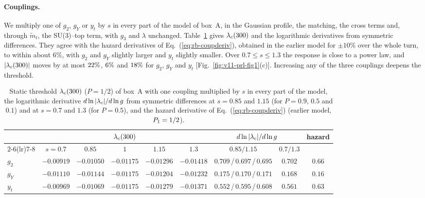 \paragraph{Couplings.}
We multiply one of $g_2$, $g_Y$ or $y_t$ by $s$ in every part of the model of box~A, in the Gaussian profile, the matching, the cross terms and, through $\tilde m_t$, the SU(3)--top term, with $g_3$ and $\lambda$ unchanged.
Table~\ref{tab:v11-coup} gives $\lambda_c(300)$ and the logarithmic derivatives from symmetric differences.
They agree with the hazard derivatives of Eq.~(\ref{eq:rb-coupderiv}), obtained in the earlier model for $\pm10\%$ over the whole turn, to within about $6\%$, with $g_2$ and $g_Y$ slightly larger and $y_t$ slightly smaller. %
Over $0.7\le s\le1.3$ the response is close to a power law, and $|\lambda_c(300)|$ moves by at most $22\%$, $6\%$ and $18\%$ for $g_2$, $g_Y$ and $y_t$ [Fig.~\ref{fig:v11-prl-fig1}(c)]. %
Increasing any of the three couplings deepens the threshold.

\begin{table}[t]
\centering
\caption{Static threshold $\lambda_c(300)$ ($P=1/2$) of box~A with one coupling multiplied by $s$ in every part of the model, the logarithmic derivative $d\ln|\lambda_c|/d\ln g$ from symmetric differences at $s=0.85$ and $1.15$ (for $P=0.9$, $0.5$ and $0.1$) and at $s=0.7$ and $1.3$ (for $P=0.5$), and the hazard derivative of Eq.~(\ref{eq:rb-coupderiv}) (earlier model, $P_1=1/2$).} %
\label{tab:v11-coup}
\small
\setlength{\tabcolsep}{4pt}
\begin{tabular}{lcccccccc}
\toprule
 & \multicolumn{5}{c}{$\lambda_c(300)$} & \multicolumn{2}{c}{$d\ln|\lambda_c|/d\ln g$} & hazard \\
\cmidrule(lr){2-6}\cmidrule(lr){7-8}
 & $s=0.7$ & $0.85$ & $1$ & $1.15$ & $1.3$ & $0.85/1.15$ & $0.7/1.3$ & \\
\midrule
$g_2$ & $-0.00919$ & $-0.01050$ & $-0.01175$ & $-0.01296$ & $-0.01418$ & $0.709$\,/\,$0.697$\,/\,$0.695$ & $0.702$ & $0.66$ \\ %
$g_Y$ & $-0.01110$ & $-0.01144$ & $-0.01175$ & $-0.01204$ & $-0.01232$ & $0.175$\,/\,$0.170$\,/\,$0.171$ & $0.168$ & $0.16$ \\ %
$y_t$ & $-0.00969$ & $-0.01069$ & $-0.01175$ & $-0.01279$ & $-0.01371$ & $0.552$\,/\,$0.595$\,/\,$0.608$ & $0.561$ & $0.63$ \\ %
\bottomrule
\end{tabular}
\end{table}

